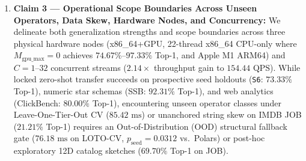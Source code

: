 \documentclass[10pt,a4paper]{article}
\begin{document}
\begin{enumerate}[leftmargin=1.5em,itemsep=4pt]
    \item \textbf{Claim 3 --- Operational Scope Boundaries Across Unseen Operators, Data Skew, Hardware Nodes, and Concurrency:} We delineate both generalization strengths and scope boundaries across three physical hardware nodes (x86\_64+GPU, 22-thread x86\_64 CPU-only where $M_{\text{gpu\_max}}=0$ achieves $74.67\%\text{--}97.33\%$ Top-1, and Apple M1 ARM64) and $C=1\text{--}32$ concurrent streams ($2.14\times$ throughput gain to $154.44\text{ QPS}$). While locked zero-shot transfer succeeds on prospective seed holdouts (\texttt{S6}: $73.33\%$ Top-1), numeric star schemas (SSB: $92.31\%$ Top-1), and web analytics (ClickBench: $80.00\%$ Top-1), encountering unseen operator classes under Leave-One-Tier-Out CV ($85.42\text{ ms}$) or unanchored string skew on IMDB JOB ($21.21\%$ Top-1) requires an Out-of-Distribution (OOD) structural fallback gate ($76.18\text{ ms}$ on LOTO-CV, $p_{\text{seed}}=0.0312$ vs.\ Polars) or post-hoc exploratory 12D catalog sketches ($69.70\%$ Top-1 on JOB).
\end{enumerate}
\end{document}
